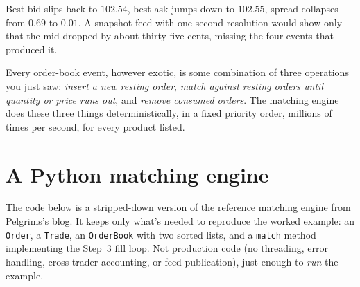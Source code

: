Best bid slips back to $102.54$, best ask jumps down to $102.55$,
spread collapses from $0.69$ to $0.01$. A snapshot feed with
one-second resolution would show only that the mid dropped by about
thirty-five cents, missing the four events that produced it.

\begin{intuitionbox}
Every order-book event, however exotic, is some combination of three
operations you just saw: \emph{insert a new resting order}, \emph{match
against resting orders until quantity or price runs out}, and
\emph{remove consumed orders}. The matching engine does these three
things deterministically, in a fixed priority order, millions of times
per second, for every product listed.
\end{intuitionbox}

\section{A Python matching engine}
\label{sec:matching_engine_py}

The code below is a stripped-down version of the reference matching
engine from Pelgrims's blog. It keeps only what's needed to reproduce
the worked example: an \texttt{Order}, a \texttt{Trade}, an
\texttt{OrderBook} with two sorted lists, and a \texttt{match} method
implementing the Step~3 fill loop. Not production code (no threading,
error handling, cross-trader accounting, or feed publication), just
enough to \emph{run} the example.

